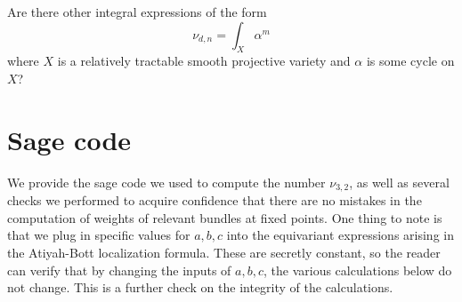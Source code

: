 \documentclass{article}
\begin{document}
\begin{question}
    \label{question:integral} Are there other integral expressions of the form \[\nu_{d,n} = \int_{X} \alpha^{m}\] where $X$ is a relatively tractable smooth projective variety and $\alpha$ is some cycle on $X$? 
\end{question}


\section{Sage code}
\label{sec:sagecode}

We provide the sage code we used to compute the number $\nu_{3,2}$, as well as several checks we performed to acquire confidence that there are no mistakes in the computation of weights of relevant bundles at fixed points. One thing to note is that we plug in specific values for $a,b,c$ into the equivariant expressions arising in the Atiyah-Bott localization formula. These are secretly constant, so the reader can verify that by changing the inputs of $a,b,c$, the various calculations below do not change. This is a further check on the integrity of the calculations.
\end{document}
